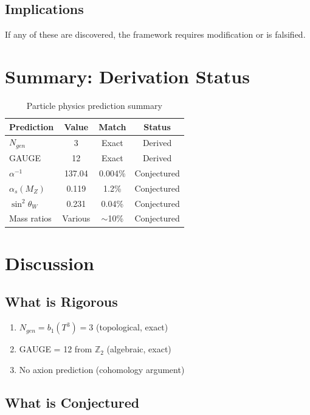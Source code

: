 \documentclass[12pt,a4paper]{article}
\begin{document}
\subsection{Implications}

If any of these are discovered, the framework requires modification or is falsified.

\section{Summary: Derivation Status}

\begin{table}[h]
\centering
\begin{tabular}{lccc}
\toprule
Prediction & Value & Match & Status \\
\midrule
$N_{gen}$ & 3 & Exact & Derived \\
GAUGE & 12 & Exact & Derived \\
$\alpha^{-1}$ & 137.04 & 0.004\% & Conjectured \\
$\alpha_s(M_Z)$ & 0.119 & 1.2\% & Conjectured \\
$\sin^2\theta_W$ & 0.231 & 0.04\% & Conjectured \\
Mass ratios & Various & $\sim$10\% & Conjectured \\
\bottomrule
\end{tabular}
\caption{Particle physics prediction summary}
\end{table}

\section{Discussion}

\subsection{What is Rigorous}

\begin{enumerate}
    \item $N_{gen} = b_1(T^3) = 3$ (topological, exact)
    \item GAUGE = 12 from $\mathbb{Z}_2$ (algebraic, exact)
    \item No axion prediction (cohomology argument)
\end{enumerate}

\subsection{What is Conjectured}
\end{document}
